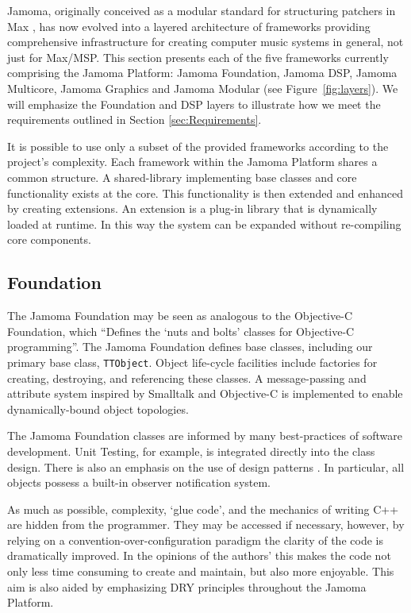 \documentclass[twoside,10pt]{article}
\begin{document}
Jamoma, originally conceived as a modular standard for structuring patchers in Max \cite{Place:2006}, has now evolved into a layered architecture of frameworks providing comprehensive infrastructure for creating computer music systems in general, not just for Max/MSP.  This section presents each of the five frameworks currently comprising the Jamoma Platform: Jamoma Foundation, Jamoma DSP, Jamoma Multicore, Jamoma Graphics and Jamoma Modular (see Figure~\ref{fig:layers}).  We will emphasize the Foundation and DSP layers to illustrate how we meet the requirements outlined in Section \ref{sec:Requirements}.
 
  
It is possible to use only a subset of the provided frameworks according to the project's complexity. 
Each framework within the Jamoma Platform shares a common structure.  A shared-library implementing base classes and core functionality exists at the core.  This functionality is then extended and enhanced by creating extensions.  An extension is a plug-in library that is dynamically loaded at runtime.  In this way the system can be expanded without re-compiling core components.


\subsection{Foundation} %

The Jamoma Foundation \cite{web7} may be seen as analogous to the Objective-C Foundation, which ``Defines the `nuts and bolts' classes for Objective-C programming''\cite{web8}.  The Jamoma Foundation defines base classes, including our primary base class, \texttt{\small{TTObject}}.  Object life-cycle facilities include factories for creating, destroying, and referencing these classes.  A message-passing and attribute system inspired by Smalltalk and Objective-C is implemented to enable dynamically-bound object topologies.  

The Jamoma Foundation classes are informed by many best-practices of software development.  Unit Testing, for example, is integrated directly into the class design.  There is also an emphasis on the use of design patterns \cite{Gamma:1995}.  In particular, all objects possess a built-in observer notification system.  

As much as possible, complexity, `glue code', and the mechanics of writing C++ are hidden from the programmer.  They may be accessed if necessary, however, by relying on a convention-over-configuration paradigm the clarity of the code is dramatically improved.  In the opinions of the authors' this makes the code not only less time consuming to create and maintain, but also more enjoyable.  This aim is also aided by emphasizing DRY principles throughout the Jamoma Platform.
\end{document}
